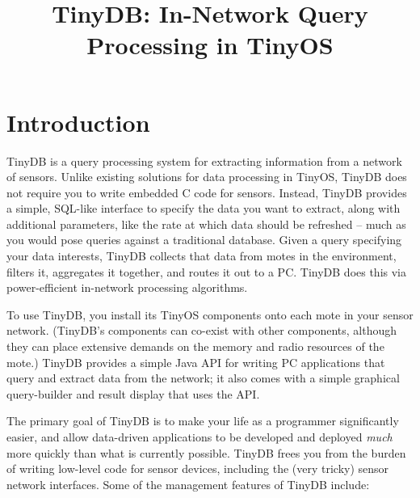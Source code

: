\documentclass[11pt]{article}
\title{TinyDB:  In-Network Query Processing in TinyOS}
\date{}
\begin{document}
\pagestyle{myheadings}

\maketitle
\thispagestyle{empty}

\section{Introduction}

TinyDB is a query processing system for extracting
information from a network of
sensors. Unlike existing
solutions for data processing in TinyOS,
TinyDB does not require you to write embedded C
code for sensors.
Instead, TinyDB provides a
simple, SQL-like interface to specify the data you want to
extract, along with additional parameters, like the rate at which data
should be refreshed -- much as you would pose queries against a
traditional database.  
Given a query specifying your data interests,
TinyDB collects that data from motes in the
environment, filters it, aggregates it together, and routes it out to
a PC.  TinyDB does this via power-efficient in-network
processing algorithms.

To use TinyDB, you install its TinyOS components onto
each mote in your sensor network. (TinyDB's components can co-exist
with other components, although they can place extensive demands on
the memory and radio resources of the mote.)  TinyDB provides a simple
Java API for writing PC applications that query and extract data from
the network; it also comes with a simple graphical query-builder and
result display that uses the API.

The primary goal of TinyDB is to make your life as a programmer
significantly easier, and allow data-driven applications to be
developed and deployed {\em much} more quickly than what is currently
possible.  TinyDB frees you from the burden of writing low-level code
for sensor devices, including the (very tricky) sensor network
interfaces.  Some of the management features of TinyDB include:
\end{document}
